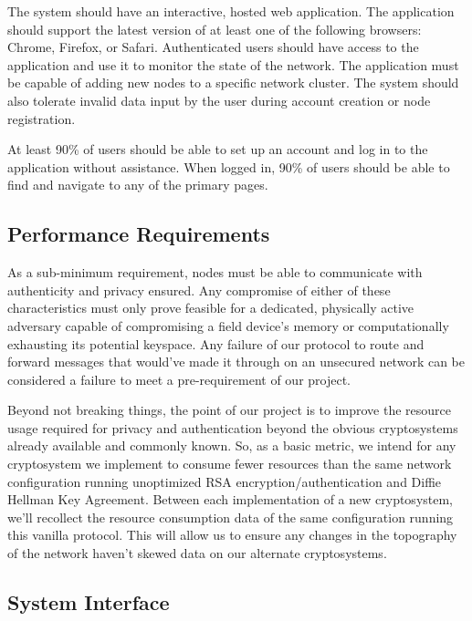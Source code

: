 \documentclass[tikz,a4paper,titlepage]{article}
\begin{document}
The system should have an interactive, hosted web application. The application should support the latest version of at least one of the following browsers: Chrome, Firefox, or Safari. Authenticated users should have access to the application and use it to monitor the state of the network. The application must be capable of adding new nodes to a specific network cluster. The system should also tolerate invalid data input by the user during account creation or node registration. 

At least 90\% of users should be able to set up an account and log in to the application without assistance. When logged in, 90\% of users should be able to find and navigate to any of the primary pages.


\subsection{Performance Requirements}

As a sub-minimum requirement, nodes must be able to communicate with authenticity and privacy ensured. Any compromise of either of these characteristics must only prove feasible for a dedicated, physically active adversary capable of compromising a field device's memory or computationally exhausting its potential keyspace. Any failure of our protocol to route and forward messages that would've made it through on an unsecured network can be considered a failure to meet a pre-requirement of our project.

Beyond not breaking things, the point of our project is to improve the resource usage required for privacy and authentication beyond the obvious cryptosystems already available and commonly known. So, as a basic metric, we intend for any cryptosystem we implement to consume fewer resources than the same network configuration running unoptimized RSA encryption/authentication and Diffie Hellman Key Agreement. Between each implementation of a new cryptosystem, we'll recollect the resource consumption data of the same configuration running this vanilla protocol. This will allow us to ensure any changes in the topography of the network haven't skewed data on our alternate cryptosystems.

\subsection{System Interface} %
\end{document}
